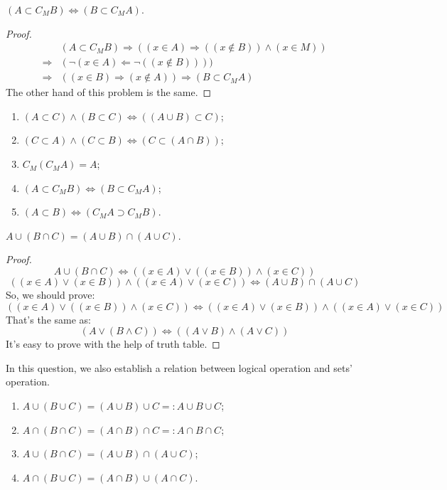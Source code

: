 \begin{question}
    $(A\subset C_{M}B)\Leftrightarrow (B\subset C_{M}A)$.
\end{question}
\begin{proof}
    \[\begin{aligned}
        &(A\subset C_{M}B)\Rightarrow ((x\in A)\Rightarrow((x\not\in B))\wedge(x\in M))\\ \Rightarrow& (\lnot(x\in A)\Leftarrow \lnot((x\not\in B))))\\
        \Rightarrow&((x\in B)\Rightarrow(x\not\in A))\Rightarrow(B\subset C_{M}A)
    \end{aligned}\]
    The other hand of this problem is the same.
\end{proof}
\begin{tips}
    \begin{enumerate}
        \item $(A\subset C)\wedge(B\subset C)\Leftrightarrow((A\cup B)\subset C)$;
        \item $(C\subset A)\wedge(C\subset B)\Leftrightarrow (C\subset(A\cap B))$;
        \item $C_{M}(C_{M}A)=A$;
        \item $(A\subset C_{M}B)\Leftrightarrow (B\subset C_{M}A)$;
        \item $(A\subset B)\Leftrightarrow(C_{M}A\supset C_{M}B)$.
    \end{enumerate}
\end{tips}
\begin{question}
    $A\cup (B\cap C)=(A\cup B)\cap (A\cup C)$.
\end{question}
\begin{proof}
    \[
        A\cup (B\cap C)\Leftrightarrow((x\in A)\vee ((x\in B))\wedge(x\in C))
    \]
    \[((x\in A)\vee(x\in B))\wedge((x\in A)\vee(x\in C))\Leftrightarrow(A\cup B)\cap (A\cup C)\]
    So, we should prove:
    \[((x\in A)\vee ((x\in B))\wedge(x\in C))\Leftrightarrow((x\in A)\vee(x\in B))\wedge((x\in A)\vee(x\in C))\]
    That's the same as:
    \[(A\vee(B\wedge C))\Leftrightarrow((A\vee B)\wedge(A\vee C))\]
    It's easy to prove with the help of truth table.
\end{proof}
In this question, we also establish a relation between logical operation and sets' operation.
\begin{tips}
    \begin{enumerate}
        \item $A\cup (B\cup C)=(A\cup B)\cup C=:A\cup B\cup C$;
        \item $A\cap (B\cap C)=(A\cap B)\cap C=:A\cap B\cap C$;
        \item $A\cup (B\cap C)=(A\cup B)\cap (A\cup C)$;
        \item $A\cap (B\cup C)=(A\cap B)\cup (A\cap C)$.
    \end{enumerate}
\end{tips}
